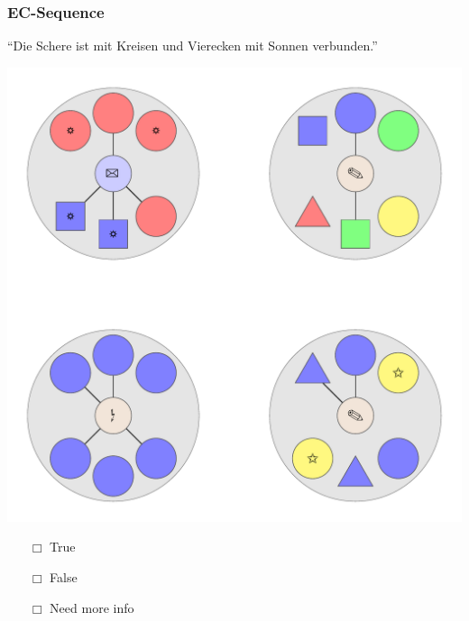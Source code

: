 \documentclass[fleqn,10pt,serif,xcolor=dvipsnames]{beamer}
\newcommand{\EC}{EC}
\newcommand{\mymark}[1]{{\color{blue}{#1}}}
\begin{document}
\begin{frame}
  \frametitle{\EC-Sequence}
  \begin{center}
    ``Die Schere ist mit Kreisen und Vierecken mit Sonnen verbunden.''

    \vspace{0.1cm}

    \includegraphics[width=0.5 \textwidth]{../../pictures/ec_01_5.pdf}

    \vspace{0.1cm}

    \begin{multicols}{3}
      \begin{itemize} 
      \item[$\Box$] True\\
        \onslide<2>{$\leadsto$  \mymark{LC}}
      \item[$\Box$] False\\
        \onslide<2>{$\leadsto$ \mymark{false}}
      \item[$\Box$] Need more info 
      \end{itemize}
    \end{multicols}

  \end{center}
\end{frame}
\end{document}
